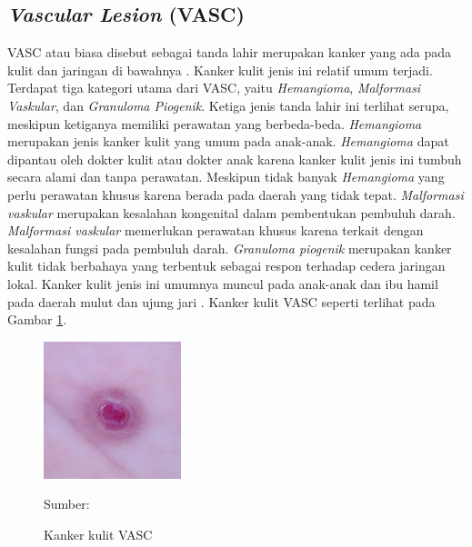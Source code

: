    \subsection{\textit{Vascular Lesion} (VASC)}
    VASC atau biasa disebut sebagai tanda lahir merupakan kanker yang ada pada kulit dan jaringan di bawahnya \citep{Balas2018}. Kanker kulit jenis ini relatif umum terjadi. Terdapat tiga kategori utama dari VASC, yaitu \textit{Hemangioma}, \textit{Malformasi Vaskular}, dan \textit{Granuloma Piogenik}. Ketiga jenis tanda lahir ini terlihat serupa, meskipun ketiganya memiliki perawatan yang berbeda-beda. \textit{Hemangioma} merupakan jenis kanker kulit yang umum pada anak-anak. \textit{Hemangioma} dapat dipantau oleh dokter kulit atau dokter anak karena kanker kulit jenis ini tumbuh secara alami dan tanpa perawatan. Meskipun tidak banyak \textit{Hemangioma} yang perlu perawatan khusus karena berada pada daerah yang tidak tepat. \textit{Malformasi vaskular} merupakan kesalahan kongenital dalam pembentukan pembuluh darah. \textit{Malformasi vaskular} memerlukan perawatan khusus karena terkait dengan kesalahan fungsi pada pembuluh darah. \textit{Granuloma piogenik} merupakan kanker kulit tidak berbahaya yang terbentuk sebagai respon terhadap cedera jaringan lokal. Kanker kulit jenis ini umumnya muncul pada anak-anak dan ibu hamil pada daerah mulut dan ujung jari \citep{Rastogi2020}. Kanker kulit VASC seperti terlihat pada Gambar \ref{fig:vasc}.
    \begin{figure}[H] 
        \begin{center} 
            \includegraphics[width=4cm]{../img/Skin Cancer VASC - Latex.jpg}
            \caption{Kanker kulit VASC} 
            \label{fig:vasc}
            Sumber: \citep{Codella2018,Combalia2019,Tschandl2018}
        \end{center} 
    \end{figure}

